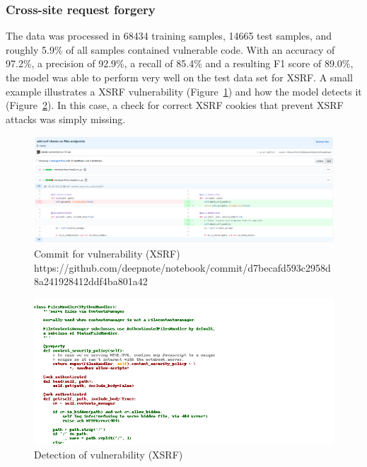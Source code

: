 \documentclass[
a4paper,
pagesize,
pdftex,
12pt,
twoside, %
BCOR=5mm, %
ngerman,
fleqn,
final,
]{scrartcl}
\begin{document}
	\newpage
	
	\subsubsection{Cross-site request forgery}
	The data was processed in 68434 training samples, 14665 test samples, and roughly 5.9\% of all samples contained vulnerable code. With an accuracy of 97.2\%, a precision of 92.9\%, a recall of 85.4\% and a resulting F1 score of 89.0\%, the model was able to perform very well on the test data set for XSRF. A small example illustrates a XSRF vulnerability (Figure~\ref{fig:xsrfA}) and how the model detects it (Figure~\ref{fig:xsrfAr}). In this case, a check for correct XSRF cookies that prevent XSRF attacks was simply missing.
	
	\begin{figure}[H]
		\centering
		\includegraphics[width=\linewidth]{Images/xsrfA}
		\caption{Commit for vulnerability (XSRF) \newline \scriptsize{https://github.com/deepnote/notebook/commit/d7becafd593c2958d8a241928412ddf4ba801a42
		}}
		\label{fig:xsrfA}
	\end{figure}
	\begin{figure}[H]
		\centering
		\includegraphics[width=\linewidth]{Images/xsrfAr}
		\caption{Detection of vulnerability (XSRF)}
		\label{fig:xsrfAr}
	\end{figure}
\end{document}
